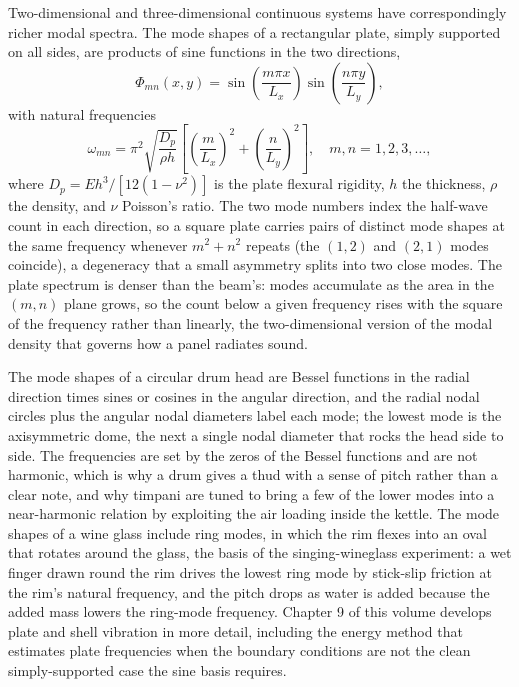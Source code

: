 Two-dimensional and three-dimensional continuous systems have
correspondingly richer modal spectra. The mode shapes of a
rectangular plate, simply supported on all sides, are products of
sine functions in the two directions,
\[
\Phi_{mn}(x, y) = \sin\!\left(\frac{m\pi x}{L_x}\right)\sin\!\left(
\frac{n\pi y}{L_y}\right),
\]
with natural frequencies
\[
\omega_{mn} = \pi^2\sqrt{\frac{D_p}{\rho h}}\left[\left(\frac{m}{L_x}
\right)^2 + \left(\frac{n}{L_y}\right)^2\right], \quad m, n = 1, 2, 3,
\ldots,
\]
where $D_p = Eh^3/[12(1 - \nu^2)]$ is the plate flexural rigidity, $h$
the thickness, $\rho$ the density, and $\nu$ Poisson's ratio. The two
mode numbers index the half-wave count in each direction, so a square
plate carries pairs of distinct mode shapes at the same frequency
whenever $m^2 + n^2$ repeats (the $(1,2)$ and $(2,1)$ modes coincide),
a degeneracy that a small asymmetry splits into two close modes. The
plate spectrum is denser than the beam's: modes accumulate as the area
in the $(m, n)$ plane grows, so the count below a given frequency rises
with the square of the frequency rather than linearly, the
two-dimensional version of the modal density that governs how a panel
radiates sound.

The mode shapes of a circular drum head are Bessel functions in the
radial direction times sines or cosines in the angular direction, and
the radial nodal circles plus the angular nodal diameters label each
mode; the lowest mode is the axisymmetric dome, the next a single nodal
diameter that rocks the head side to side. The frequencies are set by the
zeros of the Bessel functions and are not harmonic, which is why a drum
gives a thud with a sense of pitch rather than a clear note, and why
timpani are tuned to bring a few of the lower modes into a near-harmonic
relation by exploiting the air loading inside the kettle. The mode shapes
of a wine glass include ring modes, in which the rim flexes into an oval
that rotates around the glass, the basis of the singing-wineglass
experiment: a wet finger drawn round the rim drives the lowest ring mode
by stick-slip friction at the rim's natural frequency, and the pitch
drops as water is added because the added mass lowers the ring-mode
frequency. Chapter 9 of this volume develops plate and shell vibration in
more detail, including the energy method that estimates plate frequencies
when the boundary conditions are not the clean simply-supported case the
sine basis requires.

